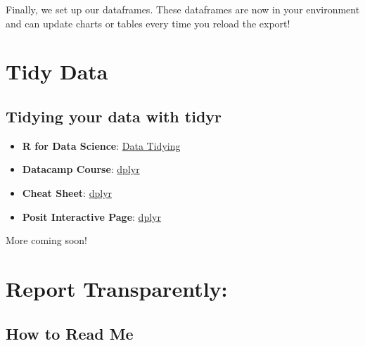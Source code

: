 \documentclass[
  english,
  letterpaper,
  DIV=11,
  numbers=noendperiod]{scrreprt}
\providecommand{\tightlist}{%
  \setlength{\itemsep}{0pt}\setlength{\parskip}{0pt}}
\begin{document}
Finally, we set up our dataframes. These dataframes are now in your
environment and can update charts or tables every time you reload the
export!

\part{Tidy Data}

\chapter{Tidying your data with
tidyr}\label{tidying-your-data-with-tidyr}

\begin{tcolorbox}[enhanced jigsaw, title=\textcolor{quarto-callout-tip-color}{\faLightbulb}\hspace{0.5em}{📖 Learning Resources}, opacityback=0, colframe=quarto-callout-tip-color-frame, rightrule=.15mm, left=2mm, toprule=.15mm, leftrule=.75mm, titlerule=0mm, bottomtitle=1mm, breakable, arc=.35mm, toptitle=1mm, bottomrule=.15mm, coltitle=black, opacitybacktitle=0.6, colback=white, colbacktitle=quarto-callout-tip-color!10!white]

\begin{itemize}
\tightlist
\item
  \textbf{R for Data Science}:
  \href{https://r4ds.hadley.nz/data-tidy.html}{Data Tidying}
\item
  \textbf{Datacamp Course}:
  \href{https://www.datacamp.com/courses/reshaping-data-with-tidyr}{dplyr}
\item
  \textbf{Cheat Sheet}:
  \href{https://rstudio.github.io/cheatsheets/tidyr.pdf}{dplyr}
\item
  \textbf{Posit Interactive Page}:
  \href{https://rstudio.github.io/cheatsheets/html/tidyr.html}{dplyr}
\end{itemize}

\end{tcolorbox}

More coming soon!

\part{Report Transparently:}

\chapter{How to Read Me}\label{how-to-read-me}
\end{document}
